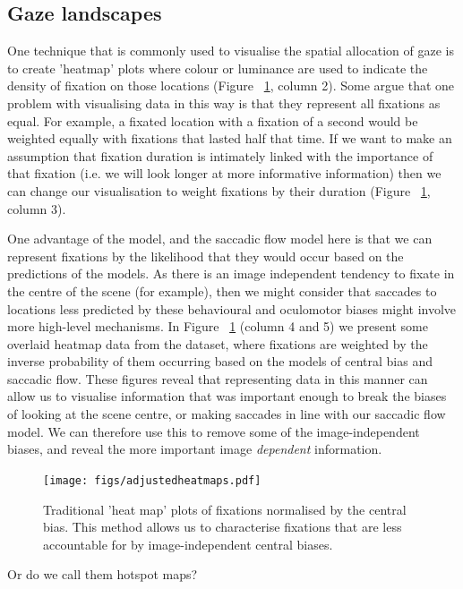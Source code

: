 \documentclass[a4paper, twocolumn, oneside, 10pt]{article}
\begin{document}
\subsection{Gaze landscapes}

One technique that is commonly used to visualise the spatial allocation of gaze is to create 'heatmap' plots where colour or luminance are used to indicate the density of fixation on those locations (Figure ~\ref{fig:adjustedHeatmaps}, column 2). Some argue that one problem with visualising data in this way is that they represent all fixations as equal. For example, a fixated location with a fixation of a second would be weighted equally with fixations that lasted half that time. If we want to make an assumption that fixation duration is intimately linked with the importance of that fixation (i.e. we will look longer at more informative information) then we can change our visualisation to weight fixations by their duration (Figure ~\ref{fig:adjustedHeatmaps}, column 3).

One advantage of the \citep{clarke-tatler2014} model, and the saccadic flow model here is that we can represent fixations by the likelihood that they would occur based on the predictions of the models. As there is an image independent tendency to fixate in the centre of the scene (for example), then we might consider that saccades to locations less predicted by these behavioural and oculomotor biases might involve more high-level mechanisms. In Figure ~\ref{fig:adjustedHeatmaps} (column 4 and 5) we present some overlaid heatmap data from the \citep{clarke2013} dataset, where fixations are weighted by the inverse probability of them occurring based on the models of central bias and saccadic flow. These figures reveal that representing data in this manner can allow us to visualise information that was important enough to break the biases of looking at the scene centre, or making saccades in line with our saccadic flow model. We can therefore use this to remove some of the image-independent biases, and reveal the more important image \emph{dependent} information.

\begin{figure}
\texttt{[image: figs/adjustedheatmaps.pdf]}
\caption{Traditional 'heat map' plots of fixations normalised by the central bias. This method allows us to characterise fixations that are less accountable for by image-independent central biases.}
\label{fig:adjustedHeatmaps}
\end{figure}

Or do we call them hotspot maps?
\end{document}
